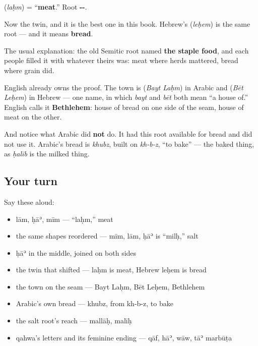 \begin{cousinweb}
\textbf{} (\emph{laḥm}) = \textquotedblleft{}\textbf{meat}.\textquotedblright{} Root \textbf{--}.

Now the twin, and it is the best one in this book. Hebrew's \textbf{} (\emph{leḥem}) is the same root — and it means \textbf{bread}.

The usual explanation: the old Semitic root named \textbf{the staple food}, and each people filled it with whatever theirs was: meat where herds mattered, bread where grain did.

English already owns the proof. The town is \textbf{ } (\emph{Bayt Laḥm}) in Arabic and \textbf{ } (\emph{Bēt Leḥem}) in Hebrew — one name, in which \emph{bayt} and \emph{bēt} both mean \textquotedblleft{}a house of.\textquotedblright{} English calls it \textbf{Bethlehem}: house of bread on one side of the seam, house of meat on the other.

And notice what Arabic did \textbf{not} do. It had this root available for bread and did not use it. Arabic's bread is \emph{khubz}, built on \emph{kh-b-z}, \textquotedblleft{}to bake\textquotedblright{} — the baked thing, as \emph{ḥalīb} is the milked thing.
\end{cousinweb}

\subsection*{Your turn}
Say these aloud:

\begin{itemize}
\raggedright
  \item lām, ḥāʾ, mīm — \textquotedblleft{}laḥm,\textquotedblright{} meat
  \item the same shapes reordered — mīm, lām, ḥāʾ is \textquotedblleft{}milḥ,\textquotedblright{} salt
  \item ḥāʾ in the middle, joined on both sides
  \item the twin that shifted — laḥm is meat, Hebrew leḥem is bread
  \item the town on the seam — Bayt Laḥm, Bēt Leḥem, Bethlehem
  \item Arabic's own bread — khubz, from kh-b-z, to bake
  \item the salt root's reach — mallāḥ, malīḥ
  \item qahwa's letters and its feminine ending — qāf, hāʾ, wāw, tāʾ marbūṭa
\end{itemize}

